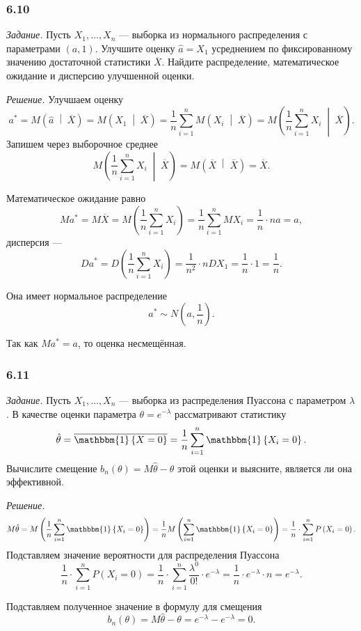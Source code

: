 \subsubsection*{6.10}

\textit{Задание.}
Пусть $X_1, \dotsc, X_n$ ---
выборка из нормального распределения с параметрами $ \left( a, 1 \right) $.
Улучшите оценку $ \hat{a} = X_1$ усреднением по фиксированному значению достаточной
статистики $ \overline{X}$.
Найдите распределение, математическое ожидание и дисперсию улучшенной оценки.

\textit{Решение.} Улучшаем оценку
$$a^* =
  M \left( \hat{a} \; \middle| \; \overline{X} \right) =
  M \left( X_1 \; \middle| \; \overline{X} \right) =
  \frac{1}{n} \sum \limits_{i = 1}^n M \left( X_i \; \middle| \; \overline{X} \right) =
  M \left( \frac{1}{n} \sum \limits_{i = 1}^n X_i \; \middle| \; \overline{X} \right).$$
Запишем через выборочное среднее
$$M \left( \frac{1}{n} \sum \limits_{i = 1}^n X_i \; \middle| \; \overline{X} \right) =
  M \left( \overline{X} \; \middle| \; \overline{X} \right) =
  \overline{X}.$$

Математическое ожидание равно
$$Ma^* =
  M \overline{X} =
  M \left( \frac{1}{n} \sum \limits_{i = 1}^n X_i \right) =
  \frac{1}{n} \sum \limits_{i = 1}^n MX_i =
  \frac{1}{n} \cdot na =
  a,$$
дисперсия ---
$$Da^* =
  D \left( \frac{1}{n} \sum \limits_{i = 1}^n X_i \right) =
  \frac{1}{n^2} \cdot n DX_1 =
  \frac{1}{n} \cdot 1 =
  \frac{1}{n}.$$

Она имеет нормальное распределение
$$a^* \sim
  N \left( a, \frac{1}{n} \right).$$

Так как $Ma^* = a$, то оценка несмещённая.

\subsubsection*{6.11}

\textit{Задание.}
Пусть $X_1, \dotsc, X_n$ --- выборка из распределения Пуассона с параметром $ \lambda $.
В качестве оценки параметра $ \theta = e^{- \lambda }$ рассматривают статистику
$$ \hat{ \theta } =
  \overline{ \mathbbm{1} \left\{ X = 0 \right\} } =
  \frac{1}{n} \sum \limits_{i = 1}^n \mathbbm{1} \left\{ X_i = 0 \right\}.$$
Вычислите смещение $b_n \left( \theta \right) = M \hat{ \theta } - \theta $ этой оценки и выясните,
является ли она эффективной.

\textit{Решение.}
$$M \hat{ \theta } =
  M \left( \frac{1}{n} \sum \limits_{i = 1}^n \mathbbm{1} \left\{ X_i = 0 \right\} \right) =
  \frac{1}{n} M \left( \sum \limits_{i = 1}^n \mathbbm{1} \left\{ X_i = 0 \right\} \right) =
  \frac{1}{n} \cdot \sum \limits_{i = 1}^n P \left( X_i = 0 \right).$$
Подставляем значение вероятности для распределения Пуассона
$$ \frac{1}{n} \cdot \sum \limits_{i = 1}^n P \left( X_i = 0 \right) =
  \frac{1}{n} \cdot \sum \limits_{i = 1}^n \frac{ \lambda^0}{0!} \cdot e^{- \lambda } =
  \frac{1}{n} \cdot e^{- \lambda } \cdot n =
  e^{- \lambda }.$$

Подставляем полученное значение в формулу для смещения
$$b_n \left( \theta \right) =
  M \hat{ \theta } - \theta =
  e^{- \lambda } - e^{- \lambda } =
  0.$$
